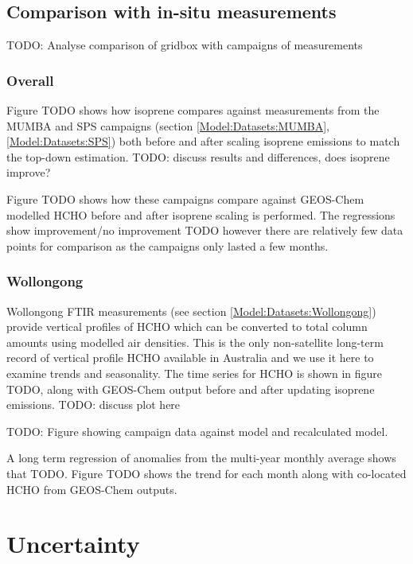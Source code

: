   \subsection{Comparison with in-situ measurements}
    
    TODO: %
    Analyse comparison of gridbox with campaigns of measurements
    
    \subsubsection{Overall}
      
      Figure TODO shows how isoprene compares against measurements from the MUMBA and SPS campaigns (section \ref{Model:Datasets:MUMBA}, \ref{Model:Datasets:SPS}) both before and after scaling isoprene emissions to match the top-down estimation.
      TODO: discuss results and differences, does isoprene improve?
      
      Figure TODO shows how these campaigns compare against GEOS-Chem modelled HCHO before and after isoprene scaling is performed. The regressions show improvement/no improvement TODO however there are relatively few data points for comparison as the campaigns only lasted a few months.
    
    \subsubsection{Wollongong}
      Wollongong FTIR measurements (see section \ref{Model:Datasets:Wollongong}) provide vertical profiles of HCHO which can be converted to total column amounts using modelled air densities.
      This is the only non-satellite long-term record of vertical profile HCHO available in Australia and we use it here to examine trends and seasonality.
      The time series for HCHO is shown in figure TODO, along with GEOS-Chem output before and after updating isoprene emissions.
      TODO: discuss plot here
      
      TODO: Figure showing campaign data against model and recalculated model.
      
      A long term regression of anomalies from the multi-year monthly average shows that TODO.
      Figure TODO shows the trend for each month along with co-located HCHO from GEOS-Chem outputs.

\section{Uncertainty}
\label{BioIsop:Uncertainty}

